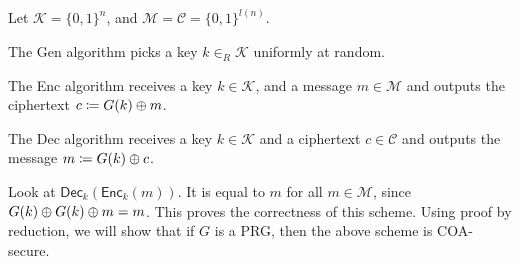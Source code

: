 \documentclass[11pt]{article}
\begin{document}
Let \(\mathcal{K} = \{0,1\}^n\), and \(\mathcal{M}  = \mathcal{C} = \{0,1\}^{l(n)}\).

The {\sf Gen} algorithm picks a key \(k \in _R \mathcal{K}\) uniformly at random. 

The {\sf Enc} algorithm receives a key \(k \in \mathcal{K}\), and a message \(m \in \mathcal{M}\) and outputs the ciphertext \(c \coloneqq G(k) \oplus m\). 

The {\sf Dec} algorithm receives a key \(k \in \mathcal{K}\) and a ciphertext \(c \in \mathcal{C}\) and outputs the message \(m \coloneqq G(k) \oplus c\).

Look at \(\mathsf{Dec}_k ( \mathsf{Enc}_k(m))\). It is equal to \(m\) for all \(m \in \mathcal{M}\), since \(G(k) \oplus G(k) \oplus m = m\). This proves the correctness of this scheme. Using proof by reduction, we will show that if \(G\) is a PRG, then the above scheme is COA-secure.
\end{document}
